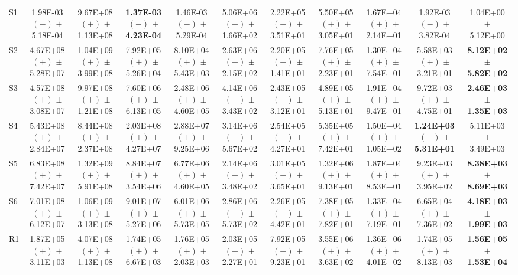 \begin{table}[t]
{\begin{tabular}{l*{10}{c}}
\midrule
S1 & 1.98E-03 $(-)$ $\pm$ 5.18E-04 & 9.67E+08 $(+)$ $\pm$ 1.13E+08 & \textbf{1.37E-03 $(-)$ $\pm$ 4.23E-04} & 1.46E-03 $(-)$ $\pm$ 5.29E-04 & 5.06E+06 $(+)$ $\pm$ 1.66E+02 & 2.22E+05 $(+)$ $\pm$ 3.51E+01 & 5.50E+05 $(+)$ $\pm$ 3.05E+01 & 1.67E+04 $(+)$ $\pm$ 2.14E+01 & 1.92E-03 $(-)$ $\pm$ 3.82E-04 & 1.04E+00 $\pm$ 5.12E+00 \\
S2 & 4.67E+08 $(+)$ $\pm$ 5.28E+07 & 1.04E+09 $(+)$ $\pm$ 3.99E+08 & 7.92E+05 $(+)$ $\pm$ 5.26E+04 & 8.10E+04 $(+)$ $\pm$ 5.43E+03 & 2.63E+06 $(+)$ $\pm$ 2.15E+02 & 2.20E+05 $(+)$ $\pm$ 1.41E+01 & 7.76E+05 $(+)$ $\pm$ 2.23E+01 & 1.30E+04 $(+)$ $\pm$ 7.54E+01 & 5.58E+03 $(+)$ $\pm$ 3.21E+01 & \textbf{8.12E+02 $\pm$ 5.82E+02} \\
S3 & 4.57E+08 $(+)$ $\pm$ 3.08E+07 & 9.97E+08 $(+)$ $\pm$ 1.21E+08 & 7.60E+06 $(+)$ $\pm$ 6.13E+05 & 2.48E+06 $(+)$ $\pm$ 4.60E+05 & 4.14E+06 $(+)$ $\pm$ 3.43E+02 & 2.43E+05 $(+)$ $\pm$ 3.12E+01 & 4.89E+05 $(+)$ $\pm$ 5.13E+01 & 1.91E+04 $(+)$ $\pm$ 9.47E+01 & 9.72E+03 $(+)$ $\pm$ 4.75E+01 & \textbf{2.46E+03 $\pm$ 1.35E+03} \\
S4 & 5.43E+08 $(+)$ $\pm$ 2.84E+07 & 8.44E+08 $(+)$ $\pm$ 2.37E+08 & 2.03E+08 $(+)$ $\pm$ 4.27E+07 & 2.88E+07 $(+)$ $\pm$ 9.25E+06 & 3.14E+06 $(+)$ $\pm$ 5.67E+02 & 2.54E+05 $(+)$ $\pm$ 4.27E+01 & 5.35E+05 $(+)$ $\pm$ 7.42E+01 & 1.50E+04 $(+)$ $\pm$ 1.05E+02 & \textbf{1.24E+03 $(-)$ $\pm$ 5.31E+01} & 5.11E+03 $\pm$ 3.49E+03 \\
S5 & 6.83E+08 $(+)$ $\pm$ 7.42E+07 & 1.32E+09 $(+)$ $\pm$ 5.91E+08 & 8.84E+07 $(+)$ $\pm$ 3.54E+06 & 6.77E+06 $(+)$ $\pm$ 4.60E+05 & 2.14E+06 $(+)$ $\pm$ 3.48E+02 & 3.01E+05 $(+)$ $\pm$ 3.65E+01 & 1.32E+06 $(+)$ $\pm$ 9.13E+01 & 1.87E+04 $(+)$ $\pm$ 8.53E+01 & 9.23E+03 $(+)$ $\pm$ 3.95E+02 & \textbf{8.38E+03 $\pm$ 8.69E+03} \\
S6 & 7.01E+08 $(+)$ $\pm$ 6.12E+07 & 1.06E+09 $(+)$ $\pm$ 3.13E+08 & 9.01E+07 $(+)$ $\pm$ 5.27E+06 & 6.01E+06 $(+)$ $\pm$ 5.73E+05 & 2.86E+06 $(+)$ $\pm$ 5.73E+02 & 2.26E+05 $(+)$ $\pm$ 4.42E+01 & 7.38E+05 $(+)$ $\pm$ 7.82E+01 & 1.33E+04 $(+)$ $\pm$ 7.19E+01 & 6.65E+04 $(+)$ $\pm$ 7.36E+02 & \textbf{4.18E+03 $\pm$ 1.99E+03} \\
\midrule
R1 & 1.87E+05 $(+)$ $\pm$ 3.11E+03 & 4.07E+08 $(+)$ $\pm$ 1.13E+08 & 1.74E+05 $(+)$ $\pm$ 6.67E+03 & 1.76E+05 $(+)$ $\pm$ 2.03E+03 & 2.03E+05 $(+)$ $\pm$ 2.27E+01 & 7.92E+05 $(+)$ $\pm$ 9.23E+01 & 3.55E+06 $(+)$ $\pm$ 3.63E+02 & 1.36E+06 $(+)$ $\pm$ 4.01E+02 & 1.74E+05 $(+)$ $\pm$ 8.13E+03 & \textbf{1.56E+05 $\pm$ 1.53E+04} \\

\end{tabular}}
\end{table}
